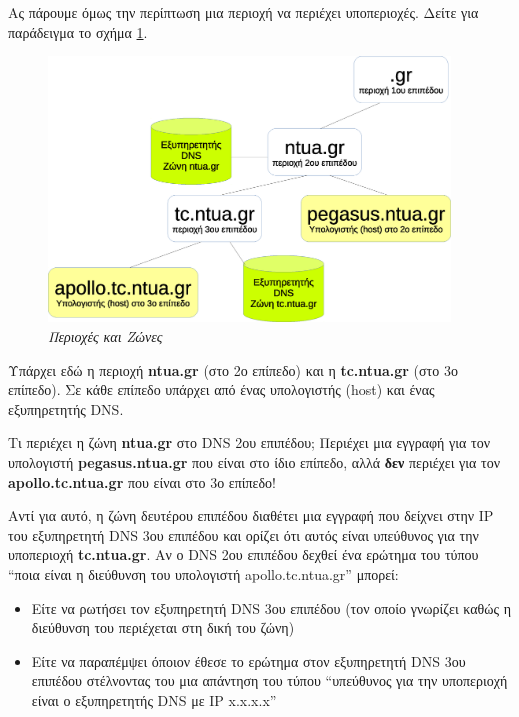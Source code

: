 Ας πάρουμε όμως την περίπτωση μια περιοχή να περιέχει υποπεριοχές. Δείτε για παράδειγμα το σχήμα \ref{6-12}. 

\begin{figure}[!ht]
  \centering
  \includegraphics[width=0.95\textwidth]{images/chapter6/6-12}
  \caption {\textsl{Περιοχές και Ζώνες}}
  \label{6-12}
\end{figure}

Υπάρχει εδώ η περιοχή \textbf{ntua.gr} (στο 2ο επίπεδο) και η \textbf{tc.ntua.gr} (στο 3ο επίπεδο). Σε κάθε επίπεδο υπάρχει από ένας υπολογιστής (host) και ένας εξυπηρετητής DNS.

Τι περιέχει η ζώνη \textbf{ntua.gr} στο DNS 2ου επιπέδου; Περιέχει μια εγγραφή για τον υπολογιστή \textbf{pegasus.ntua.gr} που είναι στο ίδιο επίπεδο, αλλά \textbf{δεν} περιέχει για τον \textbf{apollo.tc.ntua.gr} που είναι στο 3ο επίπεδο!

Αντί για αυτό, η ζώνη δευτέρου επιπέδου διαθέτει μια εγγραφή που δείχνει στην IP του εξυπηρετητή DNS 3ου επιπέδου και ορίζει ότι αυτός είναι υπεύθυνος για την υποπεριοχή \textbf{tc.ntua.gr}. Αν ο DNS 2ου επιπέδου δεχθεί ένα ερώτημα του τύπου ``ποια είναι η διεύθυνση του υπολογιστή apollo.tc.ntua.gr'' μπορεί:

\begin{itemize}
\item Είτε να ρωτήσει τον εξυπηρετητή DNS 3ου επιπέδου (τον οποίο γνωρίζει καθώς η διεύθυνση του περιέχεται στη δική του ζώνη)
\item Είτε να παραπέμψει όποιον έθεσε το ερώτημα στον εξυπηρετητή DNS 3ου επιπέδου στέλνοντας του μια απάντηση του τύπου ``υπεύθυνος για την υποπεριοχή είναι ο εξυπηρετητής DNS με IP x.x.x.x''
\end{itemize}

